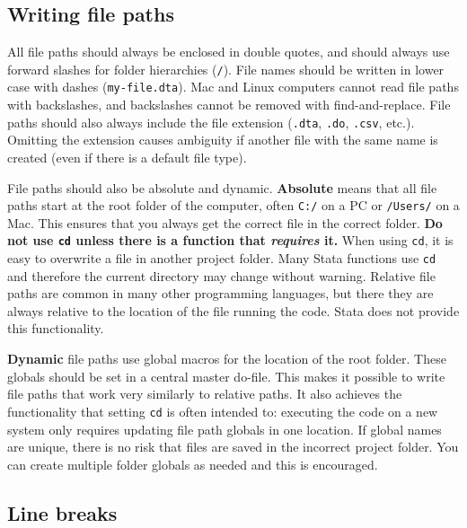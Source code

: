 
\subsection{Writing file paths}

All file paths should always be enclosed in double quotes,
and should always use forward slashes for folder hierarchies (\texttt{/}).
File names should be written in lower case with dashes (\texttt{my-file.dta}).
Mac and Linux computers cannot read file paths with backslashes,
and backslashes cannot be removed with find-and-replace.
File paths should also always include the file extension
(\texttt{.dta}, \texttt{.do}, \texttt{.csv}, etc.).
Omitting the extension causes ambiguity
if another file with the same name is created
(even if there is a default file type).

File paths should also be absolute and dynamic. \textbf{Absolute} means that all
file paths start at the root folder of the computer,
often \texttt{C:/} on a PC or \texttt{/Users/} on a Mac.
This ensures that you always get the correct file in the correct folder.
\textbf{Do not use \texttt{cd} unless there is a function that \textit{requires} it.}
When using \texttt{cd}, it is easy to overwrite a file in another project folder.
Many Stata functions use \texttt{cd} and therefore the current directory may change without warning.
Relative file paths are common in many other programming languages,
but there they are always relative to the location of the file running the code.
Stata does not provide this functionality.

\textbf{Dynamic} file paths use global macros for the location of the root folder.
These globals should be set in a central master do-file.
This makes it possible to write file paths that work very similarly to relative paths.
It also achieves the functionality that setting \texttt{cd} is often intended to:
executing the code on a new system only requires updating file path globals in one location.
If global names are unique, there is no risk that files are saved in the incorrect project folder.
You can create multiple folder globals as needed and this is encouraged.


\subsection{Line breaks}

